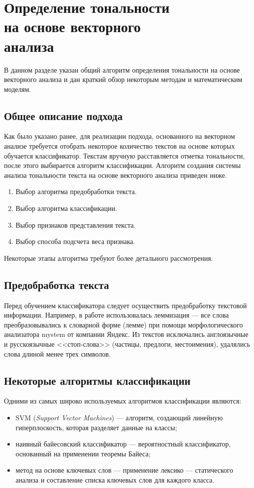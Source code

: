 \chapter[Определение тональности на основе векторного анализа]{Определение тональности\\на основе векторного\\анализа}
В данном разделе указан общий алгоритм определения тональности на основе векторного анализа и дан краткий обзор некоторым методам и математическим моделям.
\section{Общее описание подхода}
Как было указано ранее, для реализации подхода, основанного на векторном анализе требуется отобрать некоторое количество текстов на основе которых обучается классификатор. Текстам вручную расставляется отметка тональности, после этого выбирается алгоритм классификации. 
Алгоритм создания системы анализа тональности текста на основе векторного анализа приведен ниже.
\begin{enumerate}
	\item Выбор алгоритма предобработки текста.
	\item Выбор алгоритма классификации.
	\item Выбор признаков представления текста.
	\item Выбор способа подсчета веса признака.
\end{enumerate}

Некоторые этапы алгоритма требуют более детального рассмотрения. 
\section{Предобработка текста}
Перед обучением классификатора следует осуществить предобработку текстовой информации. Например, в работе \cite{prepr} использовалась леммизация --- все слова преобразовывались к словарной форме (лемме) при помощи морфологического анализатора mystem\cite{mystem} от компании Яндекс. Из текстов исключались англоязычные и русскоязычные <<стоп-слова>> (частицы, предлоги, местоимения), удалялись слова длиной менее трех
символов.
\section{Некоторые алгоритмы классификации}
Одними из самых широко используемых алгоритмов классификации являются:
\begin{itemize}
	\item SVM (\textit{Support Vector Machines}) --- алгоритм, создающий линейную гиперплоскость, которая разделяет данные на классы;
	\item наивный байесовский классификатор --- вероятностный классификатор, основанный на применении теоремы Байеса;
	\item метод на основе ключевых слов --- применение лексико --- статического анализа и составление списка ключевых слов для каждого класса. 
\end{itemize}
